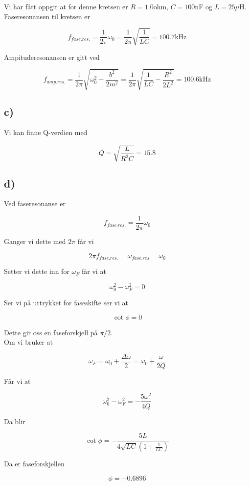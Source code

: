 \documentclass[a4paper,norsk, 10pt]{article}
\begin{document}
Vi har fått oppgit at for denne kretsen er 	$R = 1.0$ohm, $C = 100$nF og $L = 25 \mu \mathrm{H}$.\\

Faseresonansen til kretsen er 

$$
f_{fase.res.} = \frac{1}{2\pi}\omega_0 = \frac{1}{2\pi}\sqrt{\frac{1}{LC}} = 100.7 \mathrm{kHz}
$$

Ampituderesonansen er gitt ved 

$$
f_{amp.res.} = \frac{1}{2\pi}\sqrt{\omega_0^2  - \frac{b^2}{2m^2}} = \frac{1}{2\pi}\sqrt{\frac{1}{LC}  - \frac{R^2}{2L^2}} = 100.6 \mathrm{kHz}
$$

\subsection*{c)}

Vi kan finne Q-verdien med

$$
Q  = \sqrt{\frac{L}{R^2C}} = 15.8
$$

\subsection*{d)}
Ved faseresonanse er

$$
f_{fase.res.} = \frac{1}{2\pi}\omega_0
$$

Ganger vi dette med $2\pi$ får vi

$$
2\pi f_{fase.res.}  = \omega_{fase.res} = \omega_0
$$

Setter vi dette inn for $\omega_F$ får vi at 

$$
\omega_0^2 - \omega_F^2 = 0
$$

Ser vi på uttrykket for faseskifte ser vi at 

$$
\cot \phi = 0
$$

Dette gir oss en faseforskjell på $\pi /2$.\\

Om vi bruker at 

$$
\omega_F = \omega_0 + \frac{\Delta \omega}{2} = \omega_0 + \frac{\omega}{2Q}
$$

Får vi at 

$$
\omega_0^2 - \omega_F^2 = -\frac{5\omega^2}{4Q}
$$

Da blir 

$$
\cot \phi = -\frac{5L}{4\sqrt{LC}(1+\frac{1}{LC})}
$$

Da er faseforskjellen

$$
\phi = - 0.6896
$$
\end{document}
